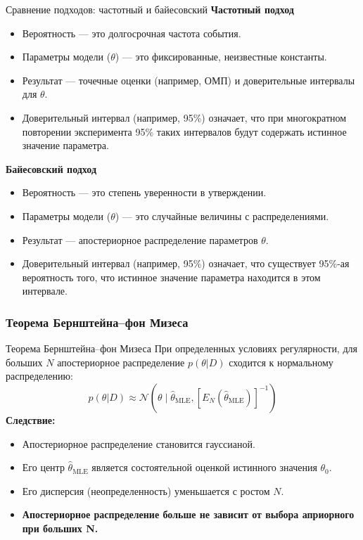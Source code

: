 \documentclass[notheorems, handout]{beamer}
\begin{document}
\begin{frame}{Сравнение подходов: частотный и байесовский}
        \textbf{Частотный подход}
        \begin{itemize}
            \item Вероятность --- это долгосрочная частота события.
            \item Параметры модели ($\theta$) --- это фиксированные, неизвестные константы.
            \item Результат --- точечные оценки (например, ОМП) и доверительные интервалы для $\theta$.
            \item Доверительный интервал (например, 95\%) означает, что при многократном повторении эксперимента 95\% таких интервалов будут содержать истинное значение параметра.
        \end{itemize}
        \textbf{Байесовский подход}
        \begin{itemize}
            \item Вероятность --- это степень уверенности в утверждении.
            \item Параметры модели ($\theta$) --- это случайные величины с распределениями.
            \item Результат --- апостериорное распределение параметров $\theta$.
            \item Доверительный интервал (например, 95\%) означает, что существует 95\%-ая вероятность того, что истинное значение параметра находится в этом интервале.
        \end{itemize}
\end{frame}
\begin{frame}
  \frametitle{Теорема Бернштейна--фон Мизеса}
  \begin{block}{Теорема Бернштейна--фон Мизеса}
    При определенных условиях регулярности, для больших $N$ апостериорное распределение $p(\theta|D)$ сходится к нормальному распределению:
    $$ p(\theta|D) \approx \mathcal{N}(\theta \mid \hat{\theta}_{\text{MLE}}, [E_N(\hat{\theta}_{\text{MLE}})]^{-1}) $$
    \textbf{Следствие:}
    \begin{itemize}
        \item Апостериорное распределение становится гауссианой.
        \item Его центр $\hat{\theta}_{\text{MLE}}$ является состоятельной оценкой истинного значения $\theta_0$.
        \item Его дисперсия (неопределенность) уменьшается с ростом $N$.
        \item \textbf{Апостериорное распределение больше не зависит от выбора априорного при больших N.}
    \end{itemize}
  \end{block}

\end{frame}
\end{document}
